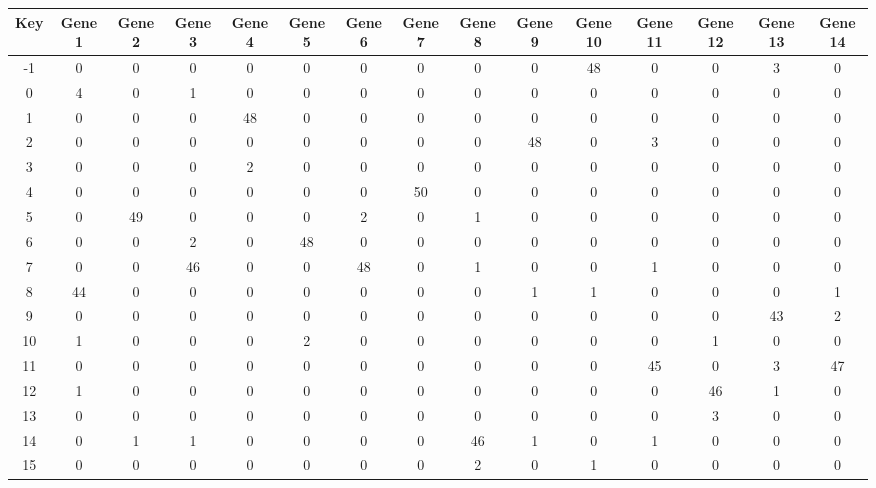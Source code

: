 \begin{tabular}{|c|c|c|c|c|c|c|c|c|c|c|c|c|c|c|}
\hline
Key & Gene 1 & Gene 2 & Gene 3 & Gene 4 & Gene 5 & Gene 6 & Gene 7 & Gene 8 & Gene 9 & Gene 10 & Gene 11 & Gene 12 & Gene 13 & Gene 14 \\
\hline
-1 & 0 & 0 & 0 & 0 & 0 & 0 & 0 & 0 & 0 & 48 & 0 & 0 & 3 & 0 \\
0 & 4 & 0 & 1 & 0 & 0 & 0 & 0 & 0 & 0 & 0 & 0 & 0 & 0 & 0 \\
1 & 0 & 0 & 0 & 48 & 0 & 0 & 0 & 0 & 0 & 0 & 0 & 0 & 0 & 0 \\
2 & 0 & 0 & 0 & 0 & 0 & 0 & 0 & 0 & 48 & 0 & 3 & 0 & 0 & 0 \\
3 & 0 & 0 & 0 & 2 & 0 & 0 & 0 & 0 & 0 & 0 & 0 & 0 & 0 & 0 \\
4 & 0 & 0 & 0 & 0 & 0 & 0 & 50 & 0 & 0 & 0 & 0 & 0 & 0 & 0 \\
5 & 0 & 49 & 0 & 0 & 0 & 2 & 0 & 1 & 0 & 0 & 0 & 0 & 0 & 0 \\
6 & 0 & 0 & 2 & 0 & 48 & 0 & 0 & 0 & 0 & 0 & 0 & 0 & 0 & 0 \\
7 & 0 & 0 & 46 & 0 & 0 & 48 & 0 & 1 & 0 & 0 & 1 & 0 & 0 & 0 \\
8 & 44 & 0 & 0 & 0 & 0 & 0 & 0 & 0 & 1 & 1 & 0 & 0 & 0 & 1 \\
9 & 0 & 0 & 0 & 0 & 0 & 0 & 0 & 0 & 0 & 0 & 0 & 0 & 43 & 2 \\
10 & 1 & 0 & 0 & 0 & 2 & 0 & 0 & 0 & 0 & 0 & 0 & 1 & 0 & 0 \\
11 & 0 & 0 & 0 & 0 & 0 & 0 & 0 & 0 & 0 & 0 & 45 & 0 & 3 & 47 \\
12 & 1 & 0 & 0 & 0 & 0 & 0 & 0 & 0 & 0 & 0 & 0 & 46 & 1 & 0 \\
13 & 0 & 0 & 0 & 0 & 0 & 0 & 0 & 0 & 0 & 0 & 0 & 3 & 0 & 0 \\
14 & 0 & 1 & 1 & 0 & 0 & 0 & 0 & 46 & 1 & 0 & 1 & 0 & 0 & 0 \\
15 & 0 & 0 & 0 & 0 & 0 & 0 & 0 & 2 & 0 & 1 & 0 & 0 & 0 & 0 \\
\hline
\end{tabular}